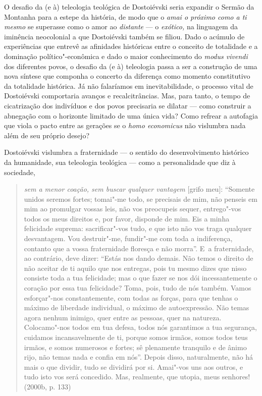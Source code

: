 O desafio da (e à) teleologia teológica de Dostoiévski seria expandir o
Sermão da Montanha para a estepe da história, de modo que o \emph{amai o
próximo como a ti mesmo} se superasse como o amor ao \emph{distante} ---
o \emph{exótico,} na linguagem da iminência neocolonial a que
Dostoiévski também se filiou. Dado o acúmulo de experiências que entrevê
as afinidades históricas entre o conceito de totalidade e a dominação
político"-econômica e dado o maior conhecimento do \emph{modus vivendi}
dos diferentes povos, o desafio da (e à) teleologia passa a ser a
construção de uma nova síntese que componha o concerto da diferença como
momento constitutivo da totalidade histórica. Já não falaríamos em
inevitabilidade, o processo vital de Dostoiévski comportaria avanços e
recalcitrâncias. Mas, para tanto, o tempo de cicatrização dos indivíduos
e dos povos precisaria se dilatar --- como construir a abnegação com o
horizonte limitado de uma única vida? Como refrear a autofagia que viola
o pacto entre as gerações se o \emph{homo economicus} não vislumbra nada
além de seu próprio desejo?

Dostoiévski vislumbra a fraternidade --- o sentido do desenvolvimento
histórico da humanidade, sua teleologia teológica --- como a
personalidade que diz à sociedade,

\begin{quote}
\emph{sem a menor coação, sem buscar qualquer vantagem} {[}grifo meu{]}:
``Somente unidos seremos fortes; tomai"-me todo, se precisais de mim, não
penseis em mim ao promulgar vossas leis, não vos preocupeis sequer,
entrego"-vos todos os meus direitos e, por favor, disponde de mim. Eis a
minha felicidade suprema: sacrificar"-vos tudo, e que isto não vos traga
qualquer desvantagem. Vou destruir"-me, fundir"-me com toda a indiferença,
contanto que a vossa fraternidade floresça e não morra''. E~a
fraternidade, ao contrário, deve dizer: ``Estás nos dando demais. Não
temos o direito de não aceitar de ti aquilo que nos entregas, pois tu
mesmo dizes que nisso consiste toda a tua felicidade; mas o que fazer se
nos dói incessantemente o coração por essa tua felicidade? Toma, pois,
tudo de nós também. Vamos esforçar"-nos constantemente, com todas as
forças, para que tenhas o máximo de liberdade individual, o máximo de
autoexpressão. Não temas agora nenhum inimigo, quer entre as pessoas,
quer na natureza. Colocamo"-nos todos em tua defesa, todos nós garantimos
a tua segurança, cuidamos incansavelmente de ti, porque somos irmãos,
somos todos teus irmãos, e somos numerosos e fortes; sê plenamente
tranquilo e de ânimo rijo, não temas nada e confia em nós''. Depois
disso, naturalmente, não há mais o que dividir, tudo se dividirá por si.
Amai"-vos uns aos outros, e tudo isto vos será concedido. Mas, realmente,
que utopia, meus senhores! (2000b, p. 133)
\end{quote}

